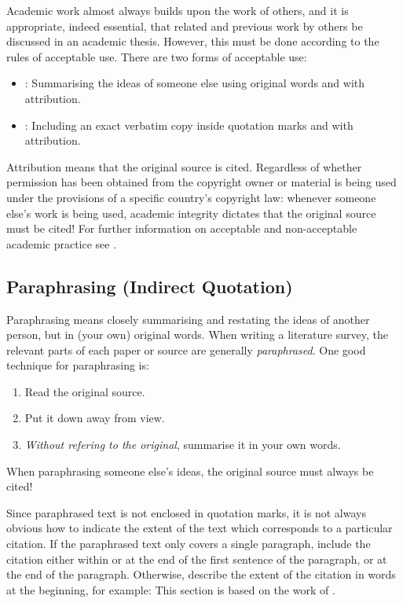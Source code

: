 Academic work almost always builds upon the work of others, and it is
appropriate, indeed essential, that related and previous work by
others be discussed in an academic thesis. However, this must be done
according to the rules of acceptable use. There are two forms of
acceptable use:
\begin{itemize}
\item {}: Summarising the ideas
  of someone else using original words and with attribution.
\item {}: Including an exact
  verbatim copy inside quotation marks and with attribution.
\end{itemize}
Attribution means that the original source is cited.
Regardless of whether permission has been obtained from the copyright
owner or material is being used under the provisions of a specific
country's copyright law: whenever someone else's work is being used,
academic integrity dictates that the original source must be cited!
%
For further information on acceptable and non-acceptable academic
practice see \parencite{FremdeFedern,Wikipedia-Zitat}.




\subsection{Paraphrasing (Indirect Quotation)}

Paraphrasing means closely summarising and restating the ideas of
another person, but in (your own) original words. When writing a
literature survey, the relevant parts of each paper or source are
generally \emph{paraphrased}. One good technique for paraphrasing is:
\begin{enumerate}
\item Read the original source.
\item Put it down away from view.
\item \emph{Without refering to the original}, summarise it in your own words.
\end{enumerate}
When paraphrasing someone else's ideas, the original source must
always be cited!

Since paraphrased text is not enclosed in quotation marks, it is not
always obvious how to indicate the extent of the text which
corresponds to a particular citation. If the paraphrased text only
covers a single paragraph, include the citation either within or at
the end of the first sentence of the paragraph, or at the end of the
paragraph. Otherwise, describe the extent of the citation in words at
the beginning, for example: This section is based on the work of
\textcite{InfoSkyIVS}.




